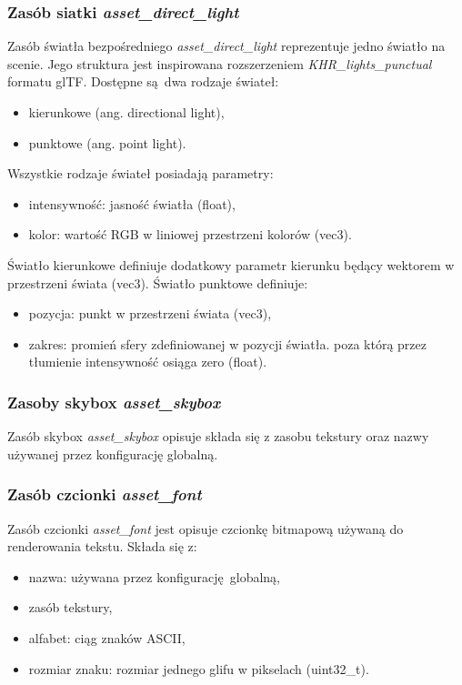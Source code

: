 \subsubsection{Zasób siatki \textit{asset\_direct\_light}}
Zasób światła bezpośredniego \textit{asset\_direct\_light} reprezentuje jedno światło na scenie.
Jego struktura jest inspirowana rozszerzeniem \textit{KHR\_lights\_punctual} formatu glTF.
Dostępne są dwa rodzaje świateł:
\begin{itemize}
	\item kierunkowe (ang. directional light),
	\item punktowe (ang. point light).
\end{itemize}
Wszystkie rodzaje świateł posiadają parametry:
\begin{itemize}
	\item intensywność: jasność światła (float),
	\item kolor: wartość RGB w liniowej przestrzeni kolorów (vec3).
\end{itemize}
Światło kierunkowe definiuje dodatkowy parametr kierunku będący wektorem w przestrzeni świata (vec3).
Światło punktowe definiuje:
\begin{itemize}
	\item pozycja: punkt w przestrzeni świata (vec3),
	\item zakres: promień sfery zdefiniowanej w pozycji światła. poza którą przez tłumienie intensywność osiąga zero (float).
\end{itemize}

\subsubsection{Zasoby skybox \textit{asset\_skybox}}
Zasób skybox \textit{asset\_skybox} opisuje składa się z zasobu tekstury oraz nazwy używanej przez konfigurację globalną.

\subsubsection{Zasób czcionki \textit{asset\_font}}
Zasób czcionki \textit{asset\_font} jest opisuje czcionkę bitmapową używaną do renderowania tekstu.
Składa się z:
\begin{itemize}
	\item nazwa: używana przez konfigurację globalną,
	\item zasób tekstury,
	\item alfabet: ciąg znaków ASCII,
	\item rozmiar znaku: rozmiar jednego glifu w pikselach (uint32\_t).
\end{itemize}

